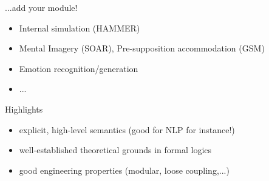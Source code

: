 \documentclass[compress]{beamer}
\begin{document}
\begin{frame}{...add your module!}

    \begin{itemize}
        \item Internal simulation (HAMMER)
        \item Mental Imagery (SOAR), Pre-supposition accommodation (GSM)
        \item Emotion recognition/generation
        \item ...
    \end{itemize}
\end{frame}


\begin{frame}{Highlights}

    \begin{itemize}
        \item {\Medium explicit}, {\Medium high-level semantics} (good for NLP for instance!)
        \item {\Medium well-established theoretical grounds} in formal logics
        \item good engineering properties (modular, loose coupling,...)
    \end{itemize}
    


\end{frame}
\end{document}

